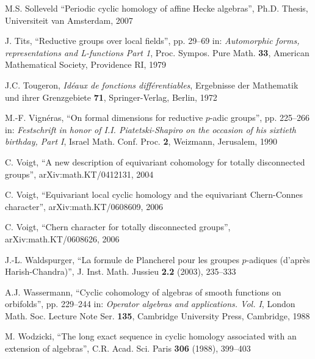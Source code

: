 \documentclass[11pt]{report}
\begin{document}
\begin{thebibliography}{99}
 M.S. Solleveld
``Periodic cyclic homology of affine Hecke algebras'',
Ph.D. Thesis, Universiteit van Amsterdam, 2007

 J. Tits,
``Reductive groups over local fields'', pp. 29--69 in:
\emph{Automorphic forms, representations and L-functions Part 1},
Proc. Sympos. Pure Math. \textbf{33}, American Mathematical
Society, Providence RI, 1979

 J.C. Tougeron,
\emph{Id\'eaux de fonctions diff\'erentiables},
Ergebnisse der Mathematik und ihrer Grenzgebiete \textbf{71},
Springer-Verlag, Berlin, 1972

 M.-F. Vign\'eras,
``On formal dimensions for reductive $p$-adic groups'', pp.
225--266 in: \emph{Festschrift in honor of I.I. Piatetski-Shapiro
on the occasion of his sixtieth birthday, Part I}, Israel Math.
Conf. Proc. \textbf{2}, Weizmann, Jerusalem, 1990

 C. Voigt,
``A new description of equivariant cohomology 
for totally disconnected groups'',
arXiv:math.KT/0412131, 2004

 C. Voigt,
``Equivariant local cyclic homology and
the equivariant Chern-Connes character'',
arXiv:math.KT/0608609, 2006

 C. Voigt,
``Chern character for totally disconnected groups'',
arXiv:math.KT/0608626, 2006

 J.-L. Waldspurger,
``La formule de Plancherel pour les groupes $p$-adiques
(d'apr\`es Harish-Chandra)'',
J. Inst. Math. Jussieu \textbf{2.2} (2003), 235--333

 A.J. Wassermann,
``Cyclic cohomology of algebras of smooth functions on orbifolds'',
pp. 229--244 in: \emph{Operator algebras and applications. Vol. I},
London Math. Soc. Lecture Note Ser. \textbf{135},
Cambridge University Press, Cambridge, 1988

 M. Wodzicki,
``The long exact sequence in cyclic homology associated
with an extension of algebras'',
C.R. Acad. Sci. Paris \textbf{306} (1988), 399--403


\end{thebibliography}
\end{document}
